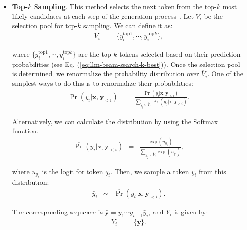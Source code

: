 \begin{itemize}
\item \vspace{0.5em} \textbf{Top-$k$ Sampling}. This method selects the next token from the top-$k$ most likely candidates at each step of the generation process~\cite{fan-etal:2018hierarchical}. Let $\overline{V}_i$ be the selection pool for top-$k$ sampling. We can define it as:
    \begin{eqnarray}
    \overline{V}_i & = & \{y_i^{\mathrm{top}1},\cdots,y_i^{\mathrm{top}k}\},
    \end{eqnarray}

    \noindent where $\{y_i^{\mathrm{top}1},\cdots,y_i^{\mathrm{top}k}\}$ are the top-$k$ tokens selected based on their prediction probabilities (see Eq. (\ref{eq:llm-beam-search-k-best})). Once the selection pool is determined, we renormalize the probability distribution over $\overline{V}_i$. One of the simplest ways to do this is to renormalize their probabilities:
    \begin{eqnarray}
    \overline{\Pr}(y_i|\mathbf{x},\mathbf{y}_{<i}) & = & \frac{\Pr(y_i|\mathbf{x},\mathbf{y}_{<i})}{\sum_{y_j \in \overline{V}_i} \Pr(y_j|\mathbf{x},\mathbf{y}_{<i})}. \label{eq:llm-topk-sampling-renormalization}
    \end{eqnarray}

    Alternatively, we can calculate the distribution by using the Softmax function:
    \begin{eqnarray}
    \overline{\Pr}(y_i|\mathbf{x},\mathbf{y}_{<i}) & = & \frac{\exp(u_{y_i})}{\sum_{y_j \in \overline{V}_i} \exp(u_{y_j})},
    \end{eqnarray}

    \noindent where $u_{y_i}$ is the logit for token $y_i$. Then, we sample a token $\bar{y}_i$ from this distribution:
    \begin{eqnarray}
    \bar{y}_i & \sim & \overline{\Pr}(y_i|\mathbf{x},\mathbf{y}_{<i}).
    \end{eqnarray}

    The corresponding sequence is $\bar{\mathbf{y}} = y_1\cdots y_{i-1} \bar{y}_i$, and $Y_i$ is given by:
    \begin{eqnarray}
    Y_i & = & \{\bar{\mathbf{y}}\}. \label{eq:llm-topk-sampling-yi-final}
    \end{eqnarray}


\end{itemize}
